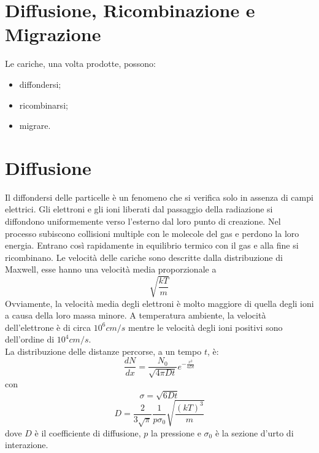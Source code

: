 \documentclass[12pt, letterpaper]{book}
\begin{document}
\section{Diffusione, Ricombinazione e Migrazione}
Le cariche, una volta prodotte, possono:
\begin{itemize}
    \item diffondersi;
    \item ricombinarsi;
    \item migrare.
\end{itemize}

\section{Diffusione}
Il diffondersi delle particelle è un fenomeno che si verifica solo in assenza di campi elettrici. Gli elettroni e gli ioni liberati dal passaggio della radiazione si diffondono uniformemente verso l'esterno dal loro punto di creazione. Nel processo subiscono collisioni multiple con le molecole del gas e perdono la loro energia. Entrano così rapidamente in equilibrio termico con il gas e alla fine si ricombinano. 
Le velocità delle cariche sono descritte dalla distribuzione di Maxwell, esse hanno una velocità media proporzionale a 
$$\sqrt{\frac{kT}{m}}$$
Ovviamente, la velocità media degli elettroni è molto maggiore di quella degli ioni a causa della loro massa minore. A temperatura ambiente, la velocità dell'elettrone è di circa $10^6 cm/s$ mentre le velocità degli ioni positivi sono dell'ordine di $10^4 cm/s$.\\
La distribuzione delle distanze percorse, a un tempo $t$, è:
$$\frac{dN}{dx}=\frac{N_0}{\sqrt{4\pi D t}}e^{-\frac{x^2}{4Dt}}$$
con
$$\sigma=\sqrt{6Dt}$$
$$D=\frac{2}{3\sqrt{\pi}}\frac{1}{p\sigma_0}\sqrt{\frac{(kT)^3}{m}}$$
dove $D$ è il coefficiente di diffusione, $p$ la pressione e $\sigma_0$ è la sezione d'urto di interazione.
\end{document}
